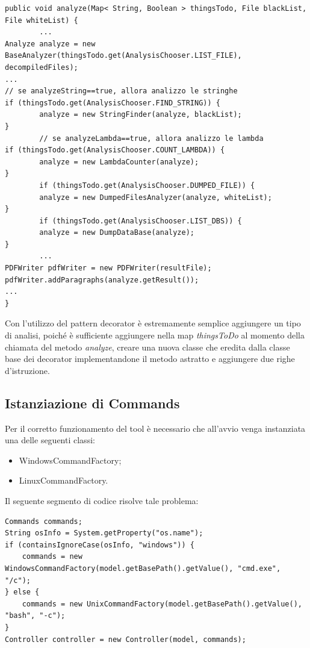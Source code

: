 \begin{lstlisting}[label={lst:analyze}]
public void analyze(Map< String, Boolean > thingsTodo, File blackList, File whiteList) {
        ...
Analyze analyze = new BaseAnalyzer(thingsTodo.get(AnalysisChooser.LIST_FILE), decompiledFiles);
...
// se analyzeString==true, allora analizzo le stringhe
if (thingsTodo.get(AnalysisChooser.FIND_STRING)) {
        analyze = new StringFinder(analyze, blackList);
}
        // se analyzeLambda==true, allora analizzo le lambda
if (thingsTodo.get(AnalysisChooser.COUNT_LAMBDA)) {
        analyze = new LambdaCounter(analyze);
}
        if (thingsTodo.get(AnalysisChooser.DUMPED_FILE)) {
        analyze = new DumpedFilesAnalyzer(analyze, whiteList);
}
        if (thingsTodo.get(AnalysisChooser.LIST_DBS)) {
        analyze = new DumpDataBase(analyze);
}
        ...
PDFWriter pdfWriter = new PDFWriter(resultFile);
pdfWriter.addParagraphs(analyze.getResult());
...
}
\end{lstlisting}

Con l'utilizzo del pattern decorator \`{e} estremamente semplice aggiungere un tipo di analisi, poiché è sufficiente aggiungere nella map \textit{thingsToDo} al momento della chiamata del metodo \textit{analyze}, creare una nuova classe che eredita dalla classe base dei decorator implementandone il metodo astratto e aggiungere due righe d'istruzione.

\subsection{Istanziazione di Commands}\label{subsec:istanziazione-di-commands}
Per il corretto funzionamento del tool è necessario che all'avvio venga instanziata una delle seguenti classi:
\begin{itemize}
    \item WindowsCommandFactory;
    \item LinuxCommandFactory.
\end{itemize}
Il seguente segmento di codice risolve tale problema:

\begin{lstlisting}[label={lst:commands}]
Commands commands;
String osInfo = System.getProperty("os.name");
if (containsIgnoreCase(osInfo, "windows")) {
    commands = new WindowsCommandFactory(model.getBasePath().getValue(), "cmd.exe", "/c");
} else {
    commands = new UnixCommandFactory(model.getBasePath().getValue(), "bash", "-c");
}
Controller controller = new Controller(model, commands);
\end{lstlisting}